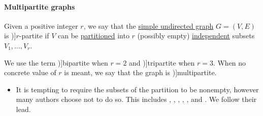 \paragraph{Multipartite graphs}

\begin{definition}\label{def:multipartite_graph}
  Given a positive integer \( r \), we say that the \hyperref[def:undirected_graph]{simple undirected graph} \( G = (V, E) \) is \term[ru=\( r \)-дольный (граф) (\cite[11]{ЕмеличевИПр1990Графы})]{\( r \)-partite} if \( V \) can be \hyperref[def:set_partition]{partitioned} into \( r \) (possibly empty) \hyperref[def:graph_independent_set]{independent} subsets \( V_1, \ldots, V_r \).

  We use the term \term[ru=двудольный (граф) (\cite[11]{ЕмеличевИПр1990Графы})]{bipartite} when \( r = 2 \) and \term[ru=трёхдольный (граф) (\cite[11]{ЕмеличевИПр1990Графы})]{tripartite} when \( r = 3 \). When no concrete value of \( r \) is meant, we say that the graph is \term[en=multipartite (graph) (\cite[ex. 8.5.5]{Knauer2011AlgGraphTheory})]{multipartite}.
\end{definition}
\begin{itemize}
  \item It is tempting to require the subsets of the partition to be nonempty, however many authors choose not to do so. This includes , , , , ,  and . We follow their lead.
\end{itemize}

